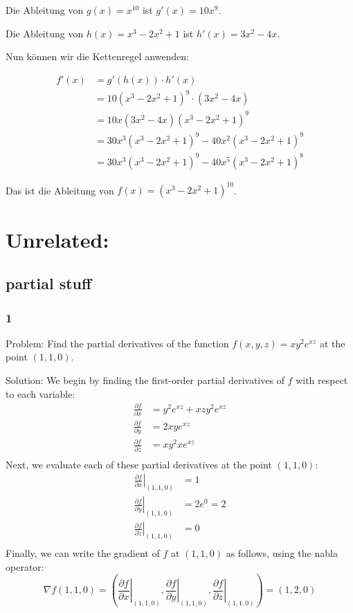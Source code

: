 \documentclass{article}
\begin{document}
Die Ableitung von $g(x) = x^{10}$ ist $g'(x) = 10x^9$.

Die Ableitung von $h(x) = x^3 - 2x^2 + 1$ ist $h'(x) = 3x^2 - 4x$.

Nun können wir die Kettenregel anwenden:

\begin{align*}
f'(x) &= g'(h(x)) \cdot h'(x) \\
&= 10(x^3 - 2x^2 + 1)^9 \cdot (3x^2 - 4x) \\
&= 10x(3x^2 - 4x)(x^3 - 2x^2 + 1)^9 \\
&= 30x^3(x^3 - 2x^2 + 1)^9 - 40x^2(x^3 - 2x^2 + 1)^9 \\
&= 30x^3(x^3 - 2x^2 + 1)^9 - 40x^5(x^3 - 2x^2 + 1)^8
\end{align*}

Das ist die Ableitung von $f(x) = (x^3 - 2x^2 + 1)^{10}$.





\clearpage
\section{Unrelated:}
\subsection{partial stuff}
\subsubsection{1}
Problem: Find the partial derivatives of the function $f(x,y,z) = xy^2e^{xz}$ at the point $(1,1,0)$.

Solution: 
We begin by finding the first-order partial derivatives of $f$ with respect to each variable:
\begin{align*}
\frac{\partial f}{\partial x} &= y^2 e^{xz} + xz y^2 e^{xz} \\
\frac{\partial f}{\partial y} &= 2xy e^{xz} \\
\frac{\partial f}{\partial z} &= xy^2 x e^{xz} \\
\end{align*}
Next, we evaluate each of these partial derivatives at the point $(1,1,0)$:
\begin{align*}
\left.\frac{\partial f}{\partial x}\right|_{(1,1,0)} &= 1 \\
\left.\frac{\partial f}{\partial y}\right|_{(1,1,0)} &= 2e^0 = 2 \\
\left.\frac{\partial f}{\partial z}\right|_{(1,1,0)} &= 0 \\
\end{align*}
Finally, we can write the gradient of $f$ at $(1,1,0)$ as follows, using the nabla operator:
\[\nabla f(1,1,0) = \left(\left.\frac{\partial f}{\partial x}\right|_{(1,1,0)}, \left.\frac{\partial f}{\partial y}\right|_{(1,1,0)}, \left.\frac{\partial f}{\partial z}\right|_{(1,1,0)}\right) = (1,2,0)\]
\end{document}
